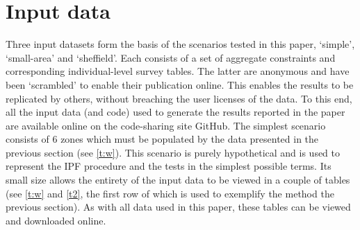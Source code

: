 \documentclass[a4paper,10pt]{article}
\begin{document}
\section{Input data}
Three input datasets form the basis of the scenarios tested in this paper,
`simple', `small-area' and `sheffield'. Each consists of a set of aggregate
constraints and corresponding individual-level survey tables.
The latter are anonymous and have been `scrambled' to enable their
publication online. This enables the results to be replicated by others,
without breaching the user licenses of the data.
To this end, all the input data (and code) used to generate the results reported
in the paper are available online on the code-sharing site GitHub.
The simplest scenario consists of 6 zones which must be populated by the
data presented in the previous section (see \cref{t:w}).
This scenario is purely hypothetical and is used to represent the IPF procedure
and the tests in the simplest possible terms. Its small size allows the entirety
of the input data to be viewed in a couple of tables 
(see \cref{t:w} and \cref{t2}, the first row of which is used
to exemplify the method the previous section). As with all
data used in this paper, these tables can be
viewed and downloaded online.

\end{document}
